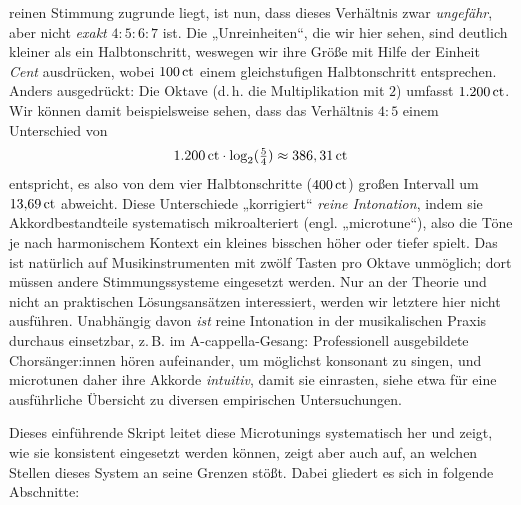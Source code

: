 reinen Stimmung zugrunde liegt, ist nun, dass dieses Verhältnis zwar
\emph{ungefähr}, aber nicht \emph{exakt} $4:5:6:7$ ist. Die „Unreinheiten“, die
wir hier sehen, sind deutlich kleiner als ein Halbtonschritt, weswegen wir ihre
Größe mit Hilfe der Einheit \emph{Cent} ausdrücken, wobei $100\,\text{ct}$ einem
gleichstufigen Halbtonschritt entsprechen. Anders ausgedrückt: Die Oktave (d.\,h. die
Multiplikation mit $2$) umfasst $1{.}200\,\text{ct}$. Wir können damit
beispielsweise sehen, dass das Verhältnis $4:5$ einem Unterschied von
\[1{.}200\,\text{ct}\cdot \log_2(\tfrac54) \approx 386,31\,\text{ct}\]%
entspricht, es also von dem vier Halbtonschritte ($400\,\text{ct}$) großen Intervall um
$13{,}69\,\text{ct}$ abweicht. Diese Unterschiede „korrigiert“ \emph{reine
  Intonation}, indem sie Akkordbestandteile systematisch mikroalteriert
(engl. „microtune“), also die Töne je nach harmonischem Kontext ein kleines
bisschen höher oder tiefer spielt. Das ist natürlich auf Musikinstrumenten mit
zwölf Tasten pro Oktave unmöglich; dort müssen andere Stimmungssysteme
eingesetzt werden. Nur an der Theorie und nicht an praktischen Lösungsansätzen
interessiert, werden wir letztere hier nicht ausführen. Unabhängig davon
\emph{ist} reine Intonation in der musikalischen Praxis durchaus einsetzbar,
z.\,B. im A-cappella-Gesang: Professionell ausgebildete Chorsänger:innen hören
aufeinander, um möglichst konsonant zu singen, und microtunen daher ihre Akkorde
\emph{intuitiv}, damit sie einrasten, siehe etwa \cite[§\,2.4]{Maria} für eine
ausführliche Übersicht zu diversen empirischen Untersuchungen.

Dieses einführende Skript leitet diese Microtunings systematisch her und zeigt,
wie sie konsistent eingesetzt werden können, zeigt aber auch auf, an welchen
Stellen dieses System an seine Grenzen stößt. Dabei gliedert es sich in folgende
Abschnitte:

